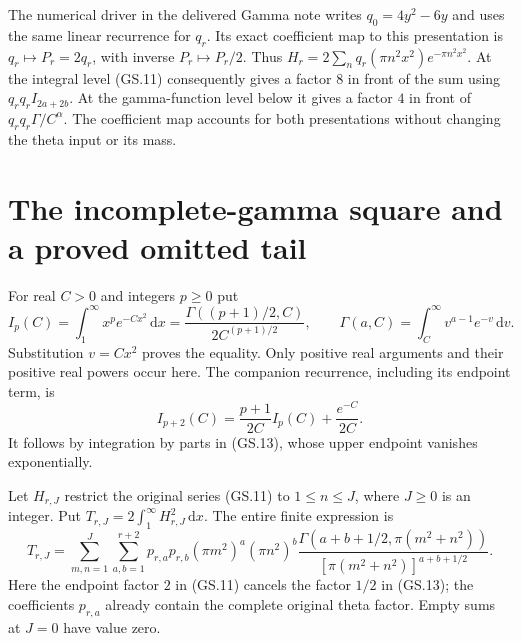 \documentclass[11pt]{article}
\newcommand{\dd}{\,\mathrm d}
\begin{document}
The numerical driver in the delivered Gamma note writes $q_0=4y^2-6y$
and uses the same linear recurrence for $q_r$. Its exact coefficient
map to this presentation is $q_r\mapsto P_r=2q_r$, with inverse
$P_r\mapsto P_r/2$. Thus $H_r=2\sum_nq_r(\pi n^2x^2)e^{-\pi n^2x^2}$.
At the integral level (GS.11) consequently gives a factor $8$
in front of the sum using $q_rq_r I_{2a+2b}$. At the gamma-function
level below it gives a factor $4$ in front of $q_rq_r\Gamma/C^\alpha$.
The coefficient map accounts for both presentations without changing
the theta input or its mass.

\section{The incomplete-gamma square and a proved omitted tail}

For real $C>0$ and integers $p\ge0$ put
\begin{equation}
 I_p(C)=\int_1^\infty x^p e^{-Cx^2}\dd x
       =\frac{\Gamma((p+1)/2,C)}{2C^{(p+1)/2}},\qquad
 \Gamma(a,C)=\int_C^\infty v^{a-1}e^{-v}\dd v.\tag{GS.13}
\end{equation}
Substitution $v=Cx^2$ proves the equality. Only positive real arguments
and their positive real powers occur here. The companion recurrence,
including its endpoint term, is
\begin{equation}
 I_{p+2}(C)=\frac{p+1}{2C}I_p(C)+\frac{e^{-C}}{2C}.
 \tag{GS.14}
\end{equation}
It follows by integration by parts in (GS.13), whose upper endpoint
vanishes exponentially.

Let $H_{r,J}$ restrict the original series (GS.11) to $1\le n\le J$,
where $J\ge0$ is an integer. Put $T_{r,J}=2\int_1^\infty H_{r,J}^2\dd x$.
The entire finite expression is
\begin{equation}
 T_{r,J}=\sum_{m,n=1}^J\sum_{a,b=1}^{r+2}
 p_{r,a}p_{r,b}(\pi m^2)^a(\pi n^2)^b
 \frac{\Gamma(a+b+1/2,\pi(m^2+n^2))}
 {[\pi(m^2+n^2)]^{a+b+1/2}}.\tag{GS.15}
\end{equation}
Here the endpoint factor $2$ in (GS.11) cancels the factor $1/2$
in (GS.13); the coefficients $p_{r,a}$ already contain the complete
original theta factor. Empty sums at $J=0$ have value zero.
\end{document}
